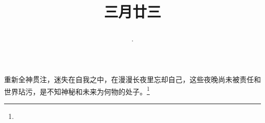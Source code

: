 \title{\date[d=1,m=5,y=2024][year:cn-y,年,month:cn,day:cn,日,·,weekday]·三月廿三 }
重新全神贯注，迷失在自我之中，在漫漫长夜里忘却自己，这些夜晚尚未被责任和世界玷污，是不知神秘和未来为何物的处子。\footnote{ }

